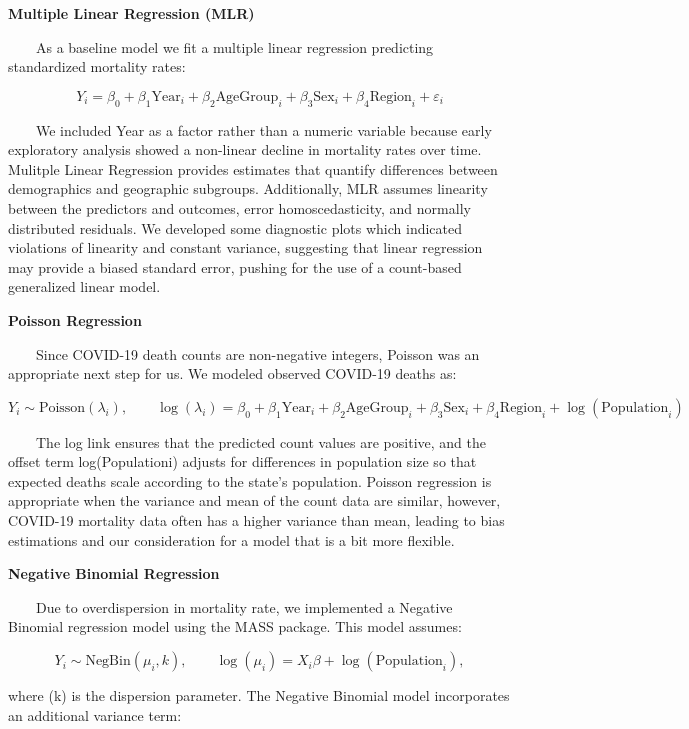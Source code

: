 \documentclass[
]{article}
\begin{document}
\textbf{Multiple Linear Regression (MLR)}

~~~~As a baseline model we fit a multiple linear regression predicting
standardized mortality rates:

\[
Y_i = \beta_0 + \beta_1 \text{Year}_i + \beta_2 \text{AgeGroup}_i +
\beta_3 \text{Sex}_i + \beta_4 \text{Region}_i + \varepsilon_i
\]

~~~~We included Year as a factor rather than a numeric variable because
early exploratory analysis showed a non-linear decline in mortality
rates over time. Mulitple Linear Regression provides estimates that
quantify differences between demographics and geographic subgroups.
Additionally, MLR assumes linearity between the predictors and outcomes,
error homoscedasticity, and normally distributed residuals. We developed
some diagnostic plots which indicated violations of linearity and
constant variance, suggesting that linear regression may provide a
biased standard error, pushing for the use of a count-based generalized
linear model.

\textbf{Poisson Regression}

~~~~Since COVID-19 death counts are non-negative integers, Poisson was
an appropriate next step for us. We modeled observed COVID-19 deaths as:

\[
Y_i \sim \text{Poisson}(\lambda_i), 
\qquad
\log(\lambda_i) = 
\beta_0 
+ \beta_1 \text{Year}_i 
+ \beta_2 \text{AgeGroup}_i 
+ \beta_3 \text{Sex}_i 
+ \beta_4 \text{Region}_i 
+ \log(\text{Population}_i)
\]

~~~~The log link ensures that the predicted count values are positive,
and the offset term log(Populationi) adjusts for differences in
population size so that expected deaths scale according to the state's
population. Poisson regression is appropriate when the variance and mean
of the count data are similar, however, COVID-19 mortality data often
has a higher variance than mean, leading to bias estimations and our
consideration for a model that is a bit more flexible.

\textbf{Negative Binomial Regression}

~~~~Due to overdispersion in mortality rate, we implemented a Negative
Binomial regression model using the MASS package. This model assumes:

\[
Y_i \sim \text{NegBin}(\mu_i, k), 
\qquad
\log(\mu_i) = X_i \beta + \log(\text{Population}_i),
\]

where (k) is the dispersion parameter. The Negative Binomial model
incorporates an additional variance term:
\end{document}
